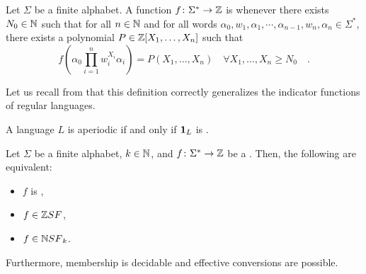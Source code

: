 \begin{definition}
    \label{ultimately-polynomial:def}
    Let $\Sigma$ be a finite alphabet. 
    A function $f \colon \Sigma^* \to \mathbb{Z}$
    is 
    whenever there exists $N_0 \in \mathbb{N}$ such that
    for all $n \in \mathbb{N}$
    and for all words $\alpha_0, w_1, \alpha_1, \cdots, \alpha_{n-1}, w_n, \alpha_n
    \in \Sigma^*$, there exists a polynomial $P \in \mathbb{Z}[X_1, \dots, X_n]$
    such that
    \begin{equation*}
        f\left(
            \alpha_0 \prod_{i = 1}^{n} w_i^{X_i} \alpha_i
        \right)
        = 
        P(X_1, \dots, X_n)
        \quad 
        \forall X_1, \dots, X_n \geq N_0
        \quad .
    \end{equation*}
\end{definition}


Let us recall from \cite{LOPEZ23b} that this definition correctly
generalizes the indicator functions of regular languages.

\begin{example}
    A language $L$ is aperiodic if and only if 
    $\mathbf{1}_{L}$ is .
\end{example}

\begin{theorem}
    \label{zsf-npoly-nsf:thm}
    Let $\Sigma$ be a finite alphabet, $k \in \mathbb{N}$,
    and $f \colon \Sigma^* \to \mathbb{Z}$ be a 
    .
    Then, the following are equivalent:
    \begin{itemize}
        \item $f$ is ,
        \item $f \in \ZSF$,
        \item $f \in \NSF[k]$.
    \end{itemize}
    Furthermore, membership is decidable and effective conversions
    are possible.
\end{theorem}


